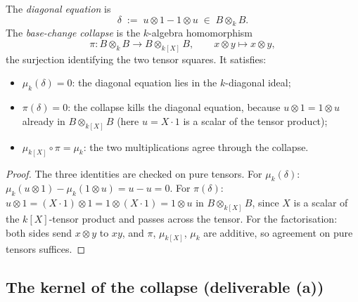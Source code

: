 \begin{definition}
  \label{pa-def:diagonalSetup}
  \leanok

  The \emph{diagonal equation} is
  \[
    \delta \;:=\; u \otimes 1 - 1 \otimes u \;\in\; B \otimes_k B .
  \]
  The \emph{base-change collapse} is the \(k\)-algebra homomorphism
  \[
    \pi \colon B \otimes_k B \longrightarrow B \otimes_{k[X]} B, \qquad x \otimes y \mapsto x
    \otimes y,
  \]
  the surjection identifying the two tensor squares. It satisfies:
  \begin{itemize}
    \item \(\mu_k(\delta) = 0\): the diagonal equation lies in the \(k\)-diagonal ideal;
    \item \(\pi(\delta) = 0\): the collapse kills the diagonal equation, because \(u \otimes 1 =
      1 \otimes u\) already in \(B \otimes_{k[X]} B\) (here \(u = X \cdot 1\) is a scalar of the
      tensor product);
    \item \(\mu_{k[X]} \circ \pi = \mu_k\): the two multiplications agree through the collapse.
  \end{itemize}
\end{definition}
\begin{proof}
  \leanok
  The three identities are checked on pure tensors. For \(\mu_k(\delta)\): \(\mu_k(u \otimes 1) -
  \mu_k(1 \otimes u) = u - u = 0\). For \(\pi(\delta)\): \(u \otimes 1 = (X \cdot 1) \otimes 1 = 1
  \otimes (X \cdot 1) = 1 \otimes u\) in \(B \otimes_{k[X]} B\), since \(X\) is a scalar of the
  \(k[X]\)-tensor product and passes across the tensor. For the factorisation: both sides send
  \(x \otimes y\) to \(xy\), and \(\pi\), \(\mu_{k[X]}\), \(\mu_k\) are additive, so agreement on
  pure tensors suffices.
\end{proof}

\subsection{The kernel of the collapse (deliverable (a))}

